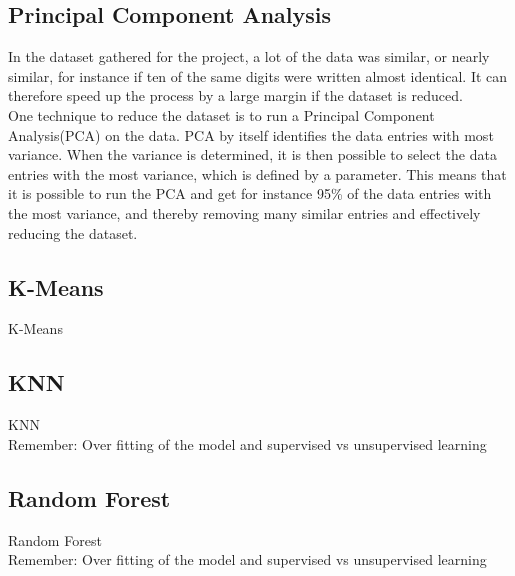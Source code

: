 \documentclass[report]{subfiles}
\begin{document}
\subsection{Principal Component Analysis}
In the dataset gathered for the project, a lot of the data was similar, or nearly similar, for instance if ten of the same digits were written almost identical. It can therefore speed up the process by a large margin if the dataset is reduced.\\
One technique to reduce the dataset is to run a Principal Component Analysis(PCA) on the data. PCA by itself identifies the data entries with most variance. When the variance is determined, it is then possible to select the data entries with the most variance, which is defined by a parameter. This means that it is possible to run the PCA and get for instance 95\% of the data entries with the most variance, and thereby removing many similar entries and effectively reducing the dataset.\\
{\color{red}{TODO should we explain more about the covariance, Eigenvectors and Eigenvalues?}}

\subsection{K-Means}
K-Means

\subsection{KNN}
KNN\\
Remember: Over fitting of the model and supervised vs unsupervised learning

\subsection{Random Forest}
Random Forest\\
Remember: Over fitting of the model and supervised vs unsupervised learning
\end{document}
